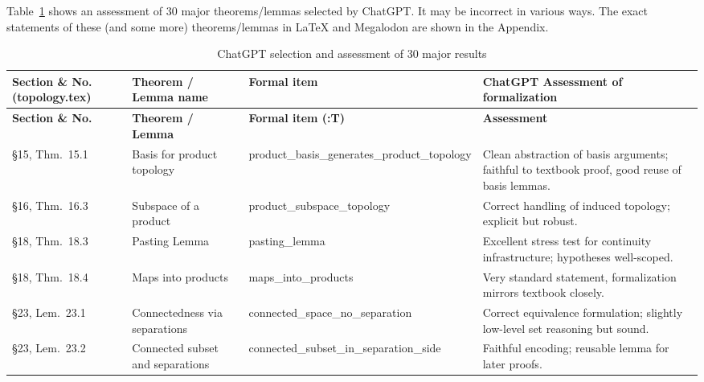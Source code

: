 \documentclass[a4paper,UKenglish,cleveref, autoref, thm-restate]{lipics-v2021}
\newcommand{\formal}[1]{{\ttfamily\small #1}}
\begin{document}
Table~\ref{tab:chatgpt30} shows an assessment of 30 major theorems/lemmas selected by ChatGPT. It may be incorrect in various ways. The exact statements of these (and some more) theorems/lemmas in LaTeX and Megalodon are shown in the Appendix.
\begin{longtable}{|p{2.6cm}|p{2.8cm}|p{3.1cm}|p{4.9cm}|}
\caption{ChatGPT selection and assessment of 30 major results}\label{tab:chatgpt30} \\
\hline
\textbf{Section \& No. (topology.tex)} &
\textbf{Theorem / Lemma name} &
\textbf{Formal item} &
\textbf{ChatGPT Assessment of formalization} \\
\hline
\endfirsthead

\hline
\textbf{Section \& No.} &
\textbf{Theorem / Lemma} &
\textbf{Formal item (:T)} &
\textbf{Assessment} \\
\hline
\endhead

\hline
\endfoot

\hline
\endlastfoot

§15, Thm.\ 15.1 &
Basis for product topology &
\formal{product\_\allowbreak basis\_\allowbreak generates\_\allowbreak product\_\allowbreak topology} &
Clean abstraction of basis arguments; faithful to textbook proof, good reuse of basis lemmas. \\
\hline

§16, Thm.\ 16.3 &
Subspace of a product &
\formal{product\_\allowbreak subspace\_\allowbreak topology} &
Correct handling of induced topology; explicit but robust. \\
\hline

§18, Thm.\ 18.3 &
Pasting Lemma &
\formal{pasting\_\allowbreak lemma} &
Excellent stress test for continuity infrastructure; hypotheses well-scoped. \\
\hline

§18, Thm.\ 18.4 &
Maps into products &
\formal{maps\_\allowbreak into\_\allowbreak products} &
Very standard statement, formalization mirrors textbook closely. \\
\hline

§23, Lem.\ 23.1 &
Connectedness via separations &
\formal{connected\_\allowbreak space\_\allowbreak no\_\allowbreak separation} &
Correct equivalence formulation; slightly low-level set reasoning but sound. \\
\hline

§23, Lem.\ 23.2 &
Connected subset and separations &
\formal{connected\_\allowbreak subset\_\allowbreak in\_\allowbreak separation\_\allowbreak side} &
Faithful encoding; reusable lemma for later proofs. \\
\hline


\end{longtable}
\end{document}

